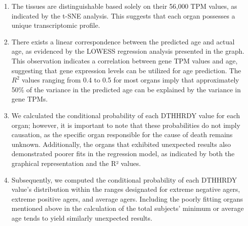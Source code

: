 \documentclass[twocolumn]{article}
\begin{document}
\begin{enumerate}
    \item The tissues are distinguishable based solely on their 56,000 TPM values, as indicated by the t-SNE analysis. This suggests that each organ possesses a unique transcriptomic profile.

    \item There exists a linear correspondence between the predicted age and actual age, as evidenced by the LOWESS regression analysis presented in the graph. This observation indicates a correlation between gene TPM values and age, suggesting that gene expression levels can be utilized for age prediction. The $R^{2}$ values ranging from 0.4 to 0.5 for most organs imply that approximately 50\% of the variance in the predicted age can be explained by the variance in gene TPMs.

    \item We calculated the conditional probability of each DTHHRDY value for each organ; however, it is important to note that these probabilities do not imply causation, as the specific organ responsible for the cause of death remains unknown. Additionally, the organs that exhibited unexpected results also demonstrated poorer fits in the regression model, as indicated by both the graphical representation and the R² values.

     \item Subsequently, we computed the conditional probability of each DTHHRDY value's distribution within the ranges designated for extreme negative agers, extreme positive agers, and average agers. Including the poorly fitting organs mentioned above in the calculation of the total subjects' minimum or average age tends to yield similarly unexpected results.
\end{enumerate}



\end{document}
